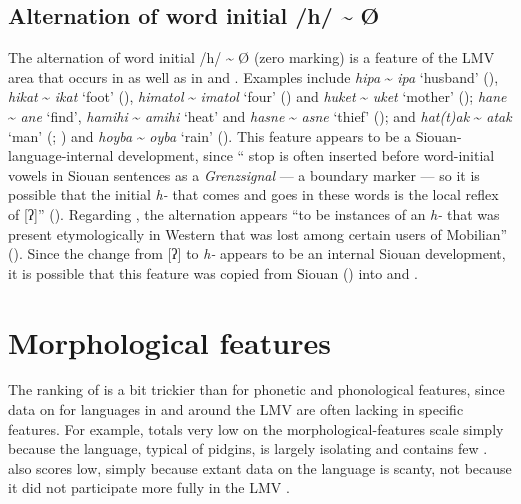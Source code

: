 \documentclass[output=paper]{LSP/langsci}
\begin{document}
\subsection{Alternation of word initial /h/ \textasciitilde{} Ø}

The alternation of word initial /h/ \textasciitilde{} Ø (zero marking) is a feature of the LMV area that occurs in  as well as in  and . Examples include  \emph{hipa} \textasciitilde{} \emph{ipa} `husband' (\citealt[42]{GatschetSwanton1932}), \emph{hikat} \textasciitilde{} \emph{ikat} `foot' (\citealt[40]{GatschetSwanton1932}), \emph{himatol} \textasciitilde{} \emph{imatol} `four' (\citealt[41]{GatschetSwanton1932}) and \emph{huket} \textasciitilde{} \emph{uket} `mother' (\citealt[46]{GatschetSwanton1932});  \emph{hane} \textasciitilde{} \emph{ane} `find', \emph{hamihi} \textasciitilde{} \emph{amihi} `heat' and \emph{hasne} \textasciitilde{} \emph{asne} `thief' (\citealt[3]{DorseySwanton1912}); and  \emph{hat(t)ak} \textasciitilde{} \emph{atak} `man' (\citealt[88]{Crawford1978}; \citealt[295]{Drechsel1996}) and \emph{hoyba} \textasciitilde{} \emph{oyba} `rain' (\citealt[306]{Drechsel1996}). This feature appears to be a Siouan-language-internal development, since “ stop is often inserted before word-initial vowels in Siouan sentences as a \textit{Grenzsignal} — a boundary marker — so it is possible that the  initial \emph{h-} that comes and goes in these words is the local reflex of [ʔ]”  (\citealt[3]{Rankin2011}). Regarding , the alternation appears “to be instances of an \emph{h-} that was present etymologically in Western  that was lost among certain users of Mobilian” (\citealt[3]{Rankin2011}). Since the change from [ʔ] to \emph{h-} appears to be an internal Siouan development, it is possible that this feature was copied from Siouan () into  and . 

\section{Morphological features}

The ranking of  is a bit trickier than for phonetic and phonological features, since data on  for languages in and around the LMV are often lacking in specific features. For example,  totals very low on the morphological-features scale simply because the language, typical of pidgins, is largely isolating and contains few .  also scores low, simply because extant data on the language is scanty, not because it did not participate more fully in the LMV .
\end{document}
